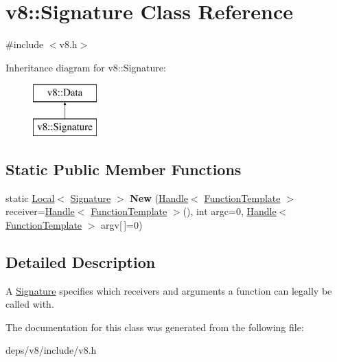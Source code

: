 \hypertarget{classv8_1_1_signature}{}\section{v8\+:\+:Signature Class Reference}
\label{classv8_1_1_signature}


{\ttfamily \#include $<$v8.\+h$>$}

Inheritance diagram for v8\+:\+:Signature\+:\begin{figure}[H]
\begin{center}
\leavevmode
\includegraphics[height=2.000000cm]{classv8_1_1_signature}
\end{center}
\end{figure}
\subsection*{Static Public Member Functions}
\begin{DoxyCompactItemize}
\item 
\hypertarget{classv8_1_1_signature_af7b86faf672247850727b2de1546b71f}{}static \hyperlink{classv8_1_1_local}{Local}$<$ \hyperlink{classv8_1_1_signature}{Signature} $>$ {\bfseries New} (\hyperlink{classv8_1_1_handle}{Handle}$<$ \hyperlink{classv8_1_1_function_template}{Function\+Template} $>$ receiver=\hyperlink{classv8_1_1_handle}{Handle}$<$ \hyperlink{classv8_1_1_function_template}{Function\+Template} $>$(), int argc=0, \hyperlink{classv8_1_1_handle}{Handle}$<$ \hyperlink{classv8_1_1_function_template}{Function\+Template} $>$ argv\mbox{[}$\,$\mbox{]}=0)\label{classv8_1_1_signature_af7b86faf672247850727b2de1546b71f}

\end{DoxyCompactItemize}


\subsection{Detailed Description}
A \hyperlink{classv8_1_1_signature}{Signature} specifies which receivers and arguments a function can legally be called with. 

The documentation for this class was generated from the following file\+:\begin{DoxyCompactItemize}
\item 
deps/v8/include/v8.\+h\end{DoxyCompactItemize}
